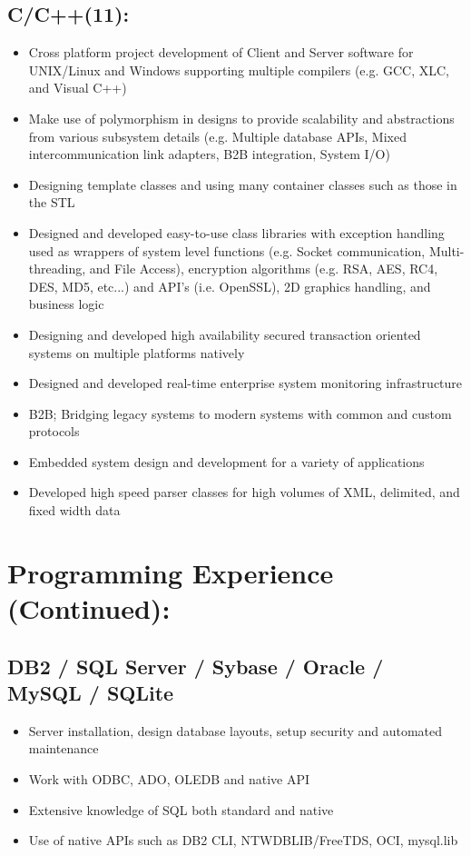 \documentclass[10pt]{report}
\begin{document}
\subsection*{C/C++(11):}


\begin{itemize}
\item Cross platform project development of Client and Server software for UNIX/Linux and Windows supporting multiple compilers (e.g. GCC, XLC, and Visual C++)
\item Make use of polymorphism in designs to provide scalability and abstractions from various subsystem details (e.g. Multiple database APIs, Mixed intercommunication link adapters, B2B integration, System I/O)
\item Designing template classes and using many container classes such as those in the STL
\item Designed and developed easy-to-use class libraries with exception handling used as wrappers of system level functions (e.g. Socket communication, Multi-threading, and File Access), encryption algorithms (e.g. RSA, AES, RC4, DES, MD5, etc...) and API’s (i.e. OpenSSL), 2D graphics handling, and business logic 
\item Designing and developed high availability secured transaction oriented systems on multiple platforms natively
\item Designed and developed real-time enterprise system monitoring infrastructure
\item B2B; Bridging legacy systems to modern systems with common and custom protocols
\item Embedded system design and development for a variety of applications
\item Developed high speed parser classes for high volumes of XML, delimited, and fixed width data
\end{itemize}


\section*{Programming Experience (Continued):}

\subsection*{DB2 / SQL Server / Sybase / Oracle / MySQL / SQLite}
\begin{itemize}
\item Server installation, design database layouts, setup security and automated maintenance
\item Work with ODBC, ADO, OLEDB and native API
\item Extensive knowledge of SQL both standard and native
\item Use of native APIs such as DB2 CLI, NTWDBLIB/FreeTDS, OCI, mysql.lib
\end{itemize}
\end{document}
